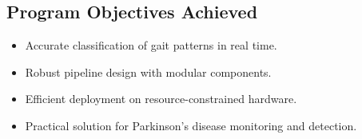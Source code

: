\subsection{Program Objectives Achieved}
\begin{itemize}
    \item Accurate classification of gait patterns in real time.
    \item Robust pipeline design with modular components.
    \item Efficient deployment on resource-constrained hardware.
    \item Practical solution for Parkinson's disease monitoring and detection.
\end{itemize}










